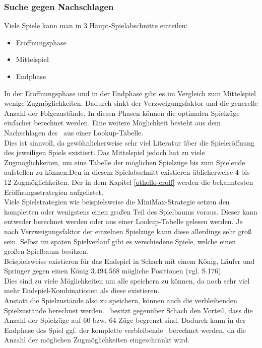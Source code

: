 \subsubsection{Suche gegen Nachschlagen}
\label{lookup}
Viele Spiele kann man in 3 Haupt-Spielabschnitte einteilen:
\begin{itemize}
\item Eröffnungsphase
\item Mittelspiel
\item Endphase
\end{itemize}
In der Eröffnungsphase und in der Endphase gibt es im Vergleich zum Mittelspiel wenige Zugmöglichkeiten. Dadurch sinkt der Verzweigungsfaktor und die generelle Anzahl der Folgezustände. In diesen Phasen können die optimalen Spielzüge einfacher berechnet werden. Eine weitere Möglichkeit besteht aus dem Nachschlagen des \states\ aus einer Lookup-Tabelle.
\\Dies ist sinnvoll, da gewöhnlicherweise sehr viel Literatur über die Spieleröffnung des jeweiligen Spiels existiert. %
Das Mittelspiel jedoch hat zu viele Zugmöglichkeiten, um eine Tabelle der möglichen Spielzüge bis zum Spielende aufstellen zu können.Den in diesem Spielabschnitt existieren üblicherweise 4 bis 12 Zugmöglichkeiten. Der in dem Kapitel \ref{othello-eroff} werden die bekanntesten Eröffnungsstrategien aufgelistet.
\\Viele Spielstrategien wie beispielsweise die MiniMax-Strategie setzen den kompletten oder wenigstens einen großen Teil des Spielbaums voraus. Dieser kann entweder berechnet werden oder aus einer Lookup-Tabelle gelesen werden. Je nach Verzweigungsfaktor der einzelnen Spielzüge kann diese allerdings sehr groß sein. Selbst im späten Spielverlauf gibt es verschiedene Spiele, welche einen großen Spielbaum besitzen.
\\Beispielsweise existieren für das Endspiel in Schach mit einem König, Läufer und Springer gegen einen König 3.494.568 mögliche Positionen (vgl. \cite{Russell.2016} S.176).
\\Dies sind zu viele Möglichkeiten um alle speichern zu können, da noch sehr viel mehr Endspiel-Kombinationen als diese existieren.
\\Anstatt die Spielzustände also zu speichern, können auch die verbleibenden Spielzustände berechnet werden. \ot\ besitzt gegenüber Schach den Vorteil, dass die Anzahl der Spielzüge auf 60 bzw. 64 Züge begrenzt sind. Dadurch kann in der Endphase des Spiel ggf. der komplette verbleibende \gtree\ berechnet werden, da die Anzahl der möglichen Zugmöglichkeiten eingeschränkt wird.
